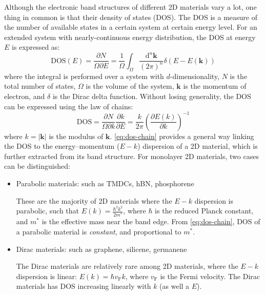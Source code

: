 Although the electronic band structures of different 2D materials vary
a lot, one thing in common is that their density of states (DOS). The
DOS is a measure of the number of available states in a certain system
at certain energy level. For an extended system with nearly-continuous
energy distribution, the DOS at energy $E$ is expressed as:
\begin{equation}
  \label{eq:ch-intro-dos}
  \mathrm{DOS}(E) = \frac{\partial N}{\Omega \partial E} =  \frac{1}{\Omega} {\displaystyle \int_{\Omega}} \frac{\mathrm{d}^{n} \mathbf{k}}{(2 \pi)^{n}}
  \delta(E - E(\mathbf{k}))
\end{equation}
where the integral is performed over a system with $d$-dimensionality,
$N$ is the total number of states,
$\Omega$ is the volume of the system, $\mathbf{k}$ is the momentum of
electron, and $\delta$ is the Dirac delta function. Without losing
generality, the DOS can be expressed using the law of chains:
\begin{equation}
  \label{eq:dos-chain}
  \mathrm{DOS} = \frac{\partial N}{\Omega \partial k} \frac{\partial k}{\partial E}
               = \frac{k}{2 \pi} \left(\frac{\partial E(k)}{\partial k}\right)^{-1}
\end{equation}
where $k=|\mathbf{k}|$ is the modulus of $\mathbf{k}$.
%
\autoref{eq:dos-chain} provides a general way linking the DOS to the
energy--momentum ($E-k$) dispersion of a 2D material, which is further
extracted from its band structure. For monolayer 2D materials, two
cases can be distinguished:
\begin{itemize}
\item Parabolic materials: such as TMDCs, hBN, phosphorene

  These are the majority of 2D materials where the $E-k$ dispersion is
  parabolic, such that
  ${\displaystyle E(k) = \frac{\hbar^{2} k^{2}}{2 m^{*}}}$, where
  $\hbar$ is the reduced Planck constant, and $m^{*}$ is the effective
  mass near the band edge. From \autoref{eq:dos-chain}, DOS of a
  parabolic material is \textit{constant}, and proportional
  to $m^{*}$.
  
\item Dirac materials: such as graphene, silicene, germanene

  The Dirac materials are relatively rare among 2D materials,
   where the $E-k$ dispersion is linear:
  $E(k) = \hbar v_{\mathrm{F}}k$, where $v_{\mathrm{F}}$ is the Fermi
  velocity. The Dirac materials has DOS increasing linearly with $k$
  (as well a $E$).
\end{itemize}

